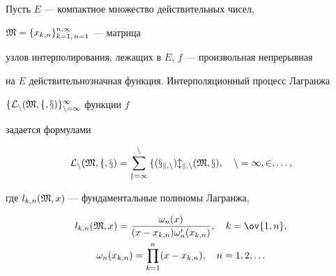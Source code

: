 \date{}







\pagestyle{plain} %













\maketitle


\label{begin}





Пусть $E$ --- компактное множество действительных чисел,


$\frak M=\{x_{k,n}\}^{n,\infty}_{k=1,\,n=1}$ --- матрица


узлов интерполирования, лежащих в $E$, $f$ --- произвольная непрерывная


на $E$ действительнозначная функция. Интерполяционный процесс Лагранжа


$\{\cal L_n(\frak M,f,x)\}^{\infty}_{n=1}$ функции $f$


задается формулами


\begin{equation}


\cal L_n(\frak M,f,x)=\sum^n_{k=1}f(x_{k,n})l_{k,n}


(\frak M,x),\quad n=1,2,\dotsc,


\end{equation}


где $l_{k,n}(\frak M,x)$ --- фундаментальные полиномы Лагранжа,


\begin{gather}


l_{k,n}(\frak M,x)=


\frac{\omega_n(x)}{(x-x_{k,n})\omega'_n(x_{k,n})},\quad


k=\ov{1,n},\\


\omega_n(x_{k,n})=\prod^n_{k=1}(x-x_{k,n}),\quad


n=1,2,\dotsc


\end{gather}





